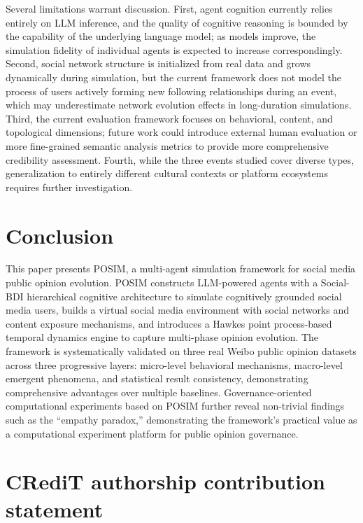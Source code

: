 \documentclass[a4paper,fleqn]{cas-dc}
\begin{document}
Several limitations warrant discussion. First, agent cognition currently relies entirely on LLM inference, and the quality of cognitive reasoning is bounded by the capability of the underlying language model; as models improve, the simulation fidelity of individual agents is expected to increase correspondingly. Second, social network structure is initialized from real data and grows dynamically during simulation, but the current framework does not model the process of users actively forming new following relationships during an event, which may underestimate network evolution effects in long-duration simulations. Third, the current evaluation framework focuses on behavioral, content, and topological dimensions; future work could introduce external human evaluation or more fine-grained semantic analysis metrics to provide more comprehensive credibility assessment. Fourth, while the three events studied cover diverse types, generalization to entirely different cultural contexts or platform ecosystems requires further investigation.

\section{Conclusion}\label{sec:conclusion}

This paper presents POSIM, a multi-agent simulation framework for social media public opinion evolution. POSIM constructs LLM-powered agents with a Social-BDI hierarchical cognitive architecture to simulate cognitively grounded social media users, builds a virtual social media environment with social networks and content exposure mechanisms, and introduces a Hawkes point process-based temporal dynamics engine to capture multi-phase opinion evolution. The framework is systematically validated on three real Weibo public opinion datasets across three progressive layers: micro-level behavioral mechanisms, macro-level emergent phenomena, and statistical result consistency, demonstrating comprehensive advantages over multiple baselines. Governance-oriented computational experiments based on POSIM further reveal non-trivial findings such as the ``empathy paradox,'' demonstrating the framework's practical value as a computational experiment platform for public opinion governance.

\section*{CRediT authorship contribution statement}
\end{document}
